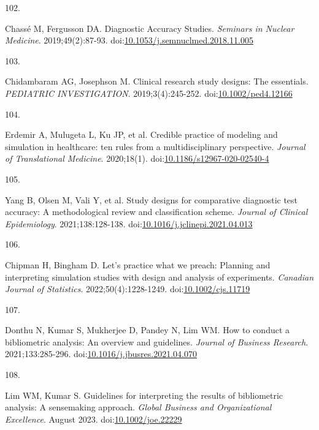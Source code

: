 \documentclass[
]{book}
\newlength{\cslhangindent}
\newlength{\csllabelwidth}
\newlength{\cslentryspacingunit} %
\newenvironment{CSLReferences}[2] %
 {%
  \setlength{\parindent}{0pt}
  \ifodd #1
  \let\oldpar\par
  \def\par{\hangindent=\cslhangindent\oldpar}
  \fi
  \setlength{\parskip}{#2\cslentryspacingunit}
 }%
 {}
\newcommand{\CSLLeftMargin}[1]{\parbox[t]{\csllabelwidth}{#1}}
\newcommand{\CSLRightInline}[1]{\parbox[t]{\linewidth - \csllabelwidth}{#1}\break}
\begin{document}
\begin{CSLReferences}{0}{0}
\leavevmode{}%
\CSLLeftMargin{102. }%
\CSLRightInline{Chassé M, Fergusson DA. Diagnostic Accuracy Studies. \emph{Seminars in Nuclear Medicine}. 2019;49(2):87-93. doi:\href{https://doi.org/10.1053/j.semnuclmed.2018.11.005}{10.1053/j.semnuclmed.2018.11.005}}

\leavevmode{}%
\CSLLeftMargin{103. }%
\CSLRightInline{Chidambaram AG, Josephson M. Clinical research study designs: The essentials. \emph{PEDIATRIC INVESTIGATION}. 2019;3(4):245-252. doi:\href{https://doi.org/10.1002/ped4.12166}{10.1002/ped4.12166}}

\leavevmode{}%
\CSLLeftMargin{104. }%
\CSLRightInline{Erdemir A, Mulugeta L, Ku JP, et al. Credible practice of modeling and simulation in healthcare: ten rules from a multidisciplinary perspective. \emph{Journal of Translational Medicine}. 2020;18(1). doi:\href{https://doi.org/10.1186/s12967-020-02540-4}{10.1186/s12967-020-02540-4}}

\leavevmode{}%
\CSLLeftMargin{105. }%
\CSLRightInline{Yang B, Olsen M, Vali Y, et al. Study designs for comparative diagnostic test accuracy: A methodological review and classification scheme. \emph{Journal of Clinical Epidemiology}. 2021;138:128-138. doi:\href{https://doi.org/10.1016/j.jclinepi.2021.04.013}{10.1016/j.jclinepi.2021.04.013}}

\leavevmode{}%
\CSLLeftMargin{106. }%
\CSLRightInline{Chipman H, Bingham D. Let's practice what we preach: Planning and interpreting simulation studies with design and analysis of experiments. \emph{Canadian Journal of Statistics}. 2022;50(4):1228-1249. doi:\href{https://doi.org/10.1002/cjs.11719}{10.1002/cjs.11719}}

\leavevmode{}%
\CSLLeftMargin{107. }%
\CSLRightInline{Donthu N, Kumar S, Mukherjee D, Pandey N, Lim WM. How to conduct a bibliometric analysis: An overview and guidelines. \emph{Journal of Business Research}. 2021;133:285-296. doi:\href{https://doi.org/10.1016/j.jbusres.2021.04.070}{10.1016/j.jbusres.2021.04.070}}

\leavevmode{}%
\CSLLeftMargin{108. }%
\CSLRightInline{Lim WM, Kumar S. Guidelines for interpreting the results of bibliometric analysis: A sensemaking approach. \emph{Global Business and Organizational Excellence}. August 2023. doi:\href{https://doi.org/10.1002/joe.22229}{10.1002/joe.22229}}


\end{CSLReferences}
\end{document}
